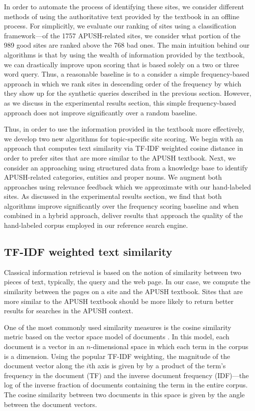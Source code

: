 \documentclass[pdfpagelabels=false,plainpages=true]{acm_proc_article-sp}
\begin{document}
In order to automate the process of identifying these sites, we consider
different methods of using the authoritative text provided by the textbook in an
offline process. For simplicitly, we evaluate our ranking of sites using a
classification framework---of the 1757 APUSH-related sites, we consider what
portion of the 989 good sites are ranked above the 768 bad ones. The main
intuition behind our algorithms is that by using the wealth of information
provided by the textbook, we can drastically improve upon scoring that is based
solely on a two or three word query. Thus, a reasonable baseline is to a consider
a simple frequency-based approach in which we rank sites 
in descending order of the frequency by which they show up for the synthetic
queries described in the previous section. However, as we discuss in the experimental results
section, this simple frequency-based approach does not improve significantly
over a random baseline.

Thus, in order to use the information provided in the textbook more effectively,
we develop two new algorithms for topic-specific site scoring. We begin with an
approach that computes text similarity via TF-IDF weighted cosine distance in order to prefer sites
that are more similar to the APUSH textbook. Next, we consider an approaching using
structured data from a knowledge base to identify APUSH-related categories,
entities and proper nouns. We augment both approaches using relevance feedback
which we approximate with our hand-labeled sites. As discussed in the
experimental results section, we find that both algorithms improve significantly
over the frequency scoring baseline and when combined in a hybrid approach,
deliver results that approach the quality of the hand-labeled corpus employed in
our reference search engine. 

\subsection{TF-IDF weighted text similarity}

Classical information retrieval is based on the notion of similarity between two
pieces of text, typically, the query and the web page.  In our case, we compute
the similarity between the pages on a site and the APUSH textbook. Sites that
are more similar to the APUSH textbook should be more likely to return better
results for searches in the APUSH context. 

One of the most commonly used similarity measures is the cosine similarity
metric based on the vector space model of documents \cite{salton1975vector}. In
this model, each document is a vector in an $n$-dimensional space in which each
term in the corpus is a dimension. Using the popular TF-IDF weighting, the
magnitude of the document vector along the $i$th axis is given by by a product
of the term's frequency in the document (TF) and the inverse document frequency
(IDF)---the log of the inverse fraction of documents containing the term in the
entire corpus. The cosine similarity between two documents in this space is
given by the angle between the document vectors.
\end{document}

